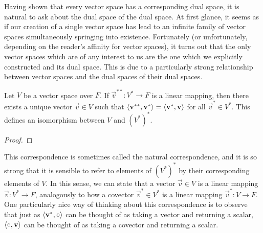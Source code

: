 \documentclass[../main.tex]{subfiles}
\begin{document}
    Having shown that every vector space has a corresponding dual space, it is natural to ask about the dual space of the dual space. At first glance, it seems as if our creation of a single vector space has lead to an infinite family of vector spaces simultaneously springing into existence. Fortunately (or unfortunately, depending on the reader's affinity for vector spaces), it turns out that the only vector spaces which are of any interest to us are the one which we explicitly constructed and its dual space. This is due to a particularly strong relationship between vector spaces and the dual spaces of their dual spaces.

    \begin{theorem}
        Let \(V\) be a vector space over \(F\). If \(\vec{v}^{**}:V^{*}\to{}F\) is a linear mapping, then there exists a unique vector \(\vec{v}\in{}V\) such that \(\langle\mathbf{v}^{**},\mathbf{v}^{*}\rangle=\langle\mathbf{v}^{*},\mathbf{v}\rangle\) for all \(\vec{v}^{*}\in{}V^{*}\). This defines an isomorphism between \(V\) and \((V^{*})^{*}\).
        \begin{proof}
        \end{proof}
    \end{theorem}

    This correspondence is sometimes called the natural correspondence, and it is so strong that it is sensible to refer to elements of \((V^{*})^{*}\) by their corresponding elements of \(V\). In this sense, we can state that a vector \(\vec{v} \in V\) is a linear mapping \(\vec{v}: V^{*} \to F\), analogously to how a covector \(\vec{v}^{*} \in V^{*}\) is a linear mapping \(\vec{v}^{*}: V \to F\). One particularly nice way of thinking about this correspondence is to observe that just as \(\langle\mathbf{v}^{*},\circ\rangle\) can be thought of as taking a vector and returning a scalar, \(\langle\circ,\mathbf{v}\rangle\) can be thought of as taking a covector and returning a scalar.
\end{document}
